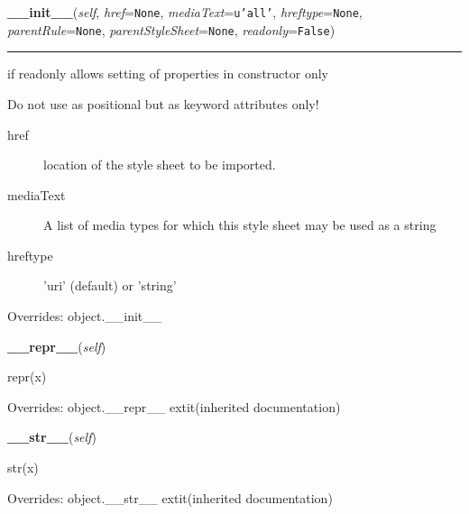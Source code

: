 \hspace{.8\funcindent}\begin{boxedminipage}{\funcwidth}

    \raggedright \textbf{\_\_init\_\_}(\textit{self}, \textit{href}={\tt None}, \textit{mediaText}={\tt \texttt{u'}\texttt{all}\texttt{'}}, \textit{hreftype}={\tt None}, \textit{parentRule}={\tt None}, \textit{parentStyleSheet}={\tt None}, \textit{readonly}={\tt False})

    \vspace{-1.5ex}

    \rule{\textwidth}{0.5\fboxrule}
\setlength{\parskip}{2ex}

if readonly allows setting of properties in constructor only

Do not use as positional but as keyword attributes only!
\begin{description}
\item[{href}] \leavevmode 
location of the style sheet to be imported.

\item[{mediaText}] \leavevmode 
A list of media types for which this style sheet may be used
as a string

\item[{hreftype}] \leavevmode 
'uri' (default) or 'string'

\end{description}
\setlength{\parskip}{1ex}
      Overrides: object.\_\_init\_\_

    \end{boxedminipage}

    \vspace{0.5ex}

\hspace{.8\funcindent}\begin{boxedminipage}{\funcwidth}

    \raggedright \textbf{\_\_repr\_\_}(\textit{self})

\setlength{\parskip}{2ex}
    repr(x)

\setlength{\parskip}{1ex}
      Overrides: object.\_\_repr\_\_ 	extit{(inherited documentation)}

    \end{boxedminipage}

    \vspace{0.5ex}

\hspace{.8\funcindent}\begin{boxedminipage}{\funcwidth}

    \raggedright \textbf{\_\_str\_\_}(\textit{self})

\setlength{\parskip}{2ex}
    str(x)

\setlength{\parskip}{1ex}
      Overrides: object.\_\_str\_\_ 	extit{(inherited documentation)}

    \end{boxedminipage}


